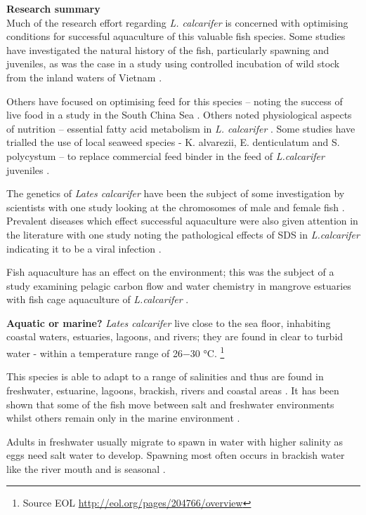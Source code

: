 \documentclass[]{book}
\theoremstyle{definition}
\theoremstyle{definition}
\theoremstyle{definition}
\theoremstyle{remark}
\begin{document}
\textbf{Research summary}\\
Much of the research effort regarding \emph{L. calcarifer} is concerned
with optimising conditions for successful aquaculture of this valuable
fish species. Some studies have investigated the natural history of the
fish, particularly spawning and juveniles, as was the case in a study
using controlled incubation of wild stock from the inland waters of
Vietnam \citep{Shadrin_2015}.

Others have focused on optimising feed for this species -- noting the
success of live food in a study in the South China Sea
\citep{Shansudin_1997}. Others noted physiological aspects of nutrition
-- essential fatty acid metabolism in \emph{L. calcarifer}
\citep{Mohd_Yusof_2010}. Some studies have trialled the use of local
seaweed species - K. alvarezii, E. denticulatum and S. polycystum -- to
replace commercial feed binder in the feed of \emph{L.calcarifer}
juveniles \citep{Shapawi_2015}.

The genetics of \emph{Lates calcarifer} have been the subject of some
investigation by scientists with one study looking at the chromosomes of
male and female fish \citep{Phimphan_2015}. Prevalent diseases which
effect successful aquaculture were also given attention in the
literature with one study noting the pathological effects of SDS in
\emph{L.calcarifer} indicating it to be a viral infection
\citep{Gibson_Kueh_2011}.

Fish aquaculture has an effect on the environment; this was the subject
of a study examining pelagic carbon flow and water chemistry in mangrove
estuaries with fish cage aquaculture of \emph{L.calcarifer}
\citep{Alongi_2003}.

\textbf{Aquatic or marine?} \emph{Lates calcarifer} live close to the
sea floor, inhabiting coastal waters, estuaries, lagoons, and rivers;
they are found in clear to turbid water - within a temperature range of
26−30 °C. \footnote{Source EOL
  \url{http://eol.org/pages/204766/overview}}

This species is able to adapt to a range of salinities and thus are
found in freshwater, estuarine, lagoons, brackish, rivers and coastal
areas \citep{Davis_1986}. It has been shown that some of the fish move
between salt and freshwater environments whilst others remain only in
the marine environment \citep{Davis_1986}.

Adults in freshwater usually migrate to spawn in water with higher
salinity as eggs need salt water to develop. Spawning most often occurs
in brackish water like the river mouth and is seasonal
\citep{Moore_1982}.
\end{document}
